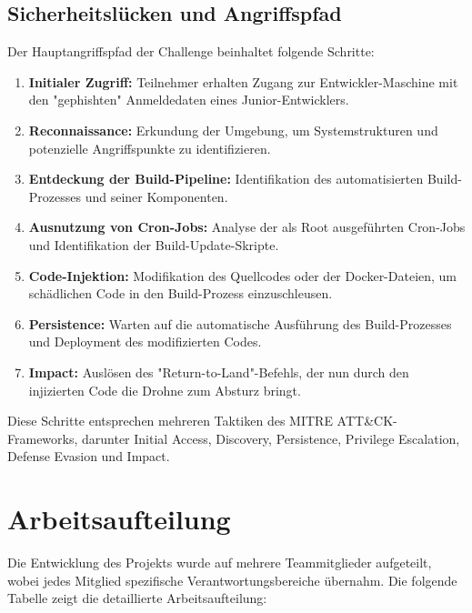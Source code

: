 \documentclass[12pt]{scrartcl}
\begin{document}
    \subsection{Sicherheitslücken und Angriffspfad}
    
    Der Hauptangriffspfad der Challenge beinhaltet folgende Schritte:
    
    \begin{enumerate}
        \item \textbf{Initialer Zugriff:} Teilnehmer erhalten Zugang zur Entwickler-Maschine mit den "gephishten" Anmeldedaten eines Junior-Entwicklers.
        
        \item \textbf{Reconnaissance:} Erkundung der Umgebung, um Systemstrukturen und potenzielle Angriffspunkte zu identifizieren.
        
        \item \textbf{Entdeckung der Build-Pipeline:} Identifikation des automatisierten Build-Prozesses und seiner Komponenten.
        
        \item \textbf{Ausnutzung von Cron-Jobs:} Analyse der als Root ausgeführten Cron-Jobs und Identifikation der Build-Update-Skripte.
        
        \item \textbf{Code-Injektion:} Modifikation des Quellcodes oder der Docker-Dateien, um schädlichen Code in den Build-Prozess einzuschleusen.
        
        \item \textbf{Persistence:} Warten auf die automatische Ausführung des Build-Prozesses und Deployment des modifizierten Codes.
        
        \item \textbf{Impact:} Auslösen des "Return-to-Land"-Befehls, der nun durch den injizierten Code die Drohne zum Absturz bringt.
    \end{enumerate}
    \noindent
    Diese Schritte entsprechen mehreren Taktiken des MITRE ATT\&CK-Frameworks, darunter Initial Access, Discovery, Persistence, Privilege Escalation, Defense Evasion und Impact.

    \section{Arbeitsaufteilung}
    
    Die Entwicklung des Projekts wurde auf mehrere Teammitglieder aufgeteilt, wobei jedes Mitglied spezifische Verantwortungsbereiche übernahm. Die folgende Tabelle zeigt die detaillierte Arbeitsaufteilung:
    
\end{document}
